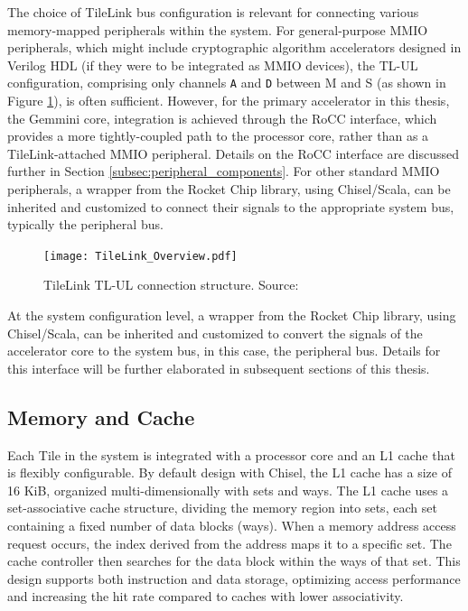The choice of TileLink bus configuration is relevant for connecting various memory-mapped peripherals within the system. For general-purpose MMIO peripherals, which might include cryptographic algorithm accelerators designed in Verilog HDL (if they were to be integrated as MMIO devices), the TL-UL configuration, comprising only channels \texttt{A} and \texttt{D} between M and S (as shown in Figure \ref{fig:tilelink_tl_ul_structure}), is often sufficient. However, for the primary accelerator in this thesis, the Gemmini core, integration is achieved through the RoCC interface, which provides a more tightly-coupled path to the processor core, rather than as a TileLink-attached MMIO peripheral. Details on the RoCC interface are discussed further in Section \ref{subsec:peripheral_components}. For other standard MMIO peripherals, a wrapper from the Rocket Chip library, using Chisel/Scala, can be inherited and customized to connect their signals to the appropriate system bus, typically the peripheral bus.


\begin{figure}[h!]
    \centering
    \texttt{[image: TileLink\_Overview.pdf]} %
    \caption{TileLink TL-UL connection structure. Source: \cite{sifive2018tilelink}}
    \label{fig:tilelink_tl_ul_structure}
\end{figure}

At the system configuration level, a wrapper from the Rocket Chip library, using Chisel/Scala, can be inherited and customized to convert the signals of the accelerator core to the system bus, in this case, the peripheral bus. Details for this interface will be further elaborated in subsequent sections of this thesis.

\subsection{Memory and Cache}
\label{subsec:memory_cache}

Each Tile in the system is integrated with a processor core and an L1 cache that is flexibly configurable. By default design with Chisel, the L1 cache has a size of 16 KiB, organized multi-dimensionally with sets and ways. The L1 cache uses a set-associative cache structure, dividing the memory region into sets, each set containing a fixed number of data blocks (ways). When a memory address access request occurs, the index derived from the address maps it to a specific set. The cache controller then searches for the data block within the ways of that set. This design supports both instruction and data storage, optimizing access performance and increasing the hit rate compared to caches with lower associativity.

